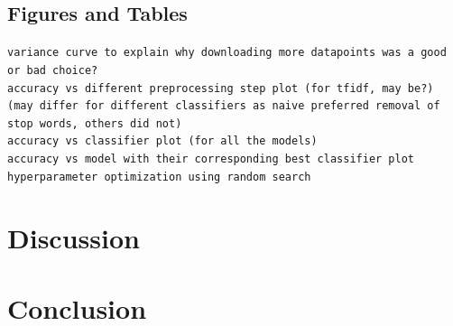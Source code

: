 \documentclass[10pt,conference,compsocconf]{IEEEtran}
\begin{document}
\subsection{Figures and Tables}


\texttt{variance curve to explain why downloading more datapoints was a good or bad choice?}\\

\texttt{accuracy vs different preprocessing step plot (for tfidf, may be?) (may differ for different classifiers as naive preferred removal of stop words, others did not)}\\

\texttt{accuracy vs classifier plot (for all the models)}\\

\texttt{accuracy vs model with their corresponding best classifier plot}\\

\texttt{hyperparameter optimization using random search}
\fi

\section{Discussion}


\section{Conclusion}



\end{document}
